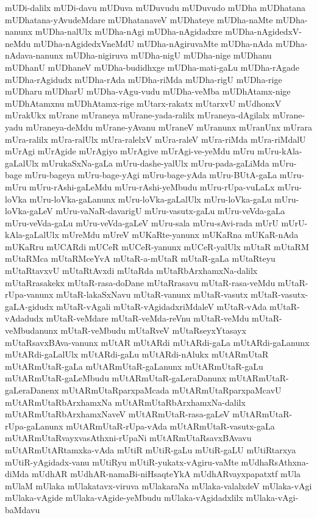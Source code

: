 {mUDi-dalilx
mUDi-davu
mUDuva
mUDuvudu
mUDuvudo
mUDha
mUDhatana
mUDhatana-yAvudeMdare
mUDhatanaveV
mUDhateye
mUDha-naMte
mUDha-nanunx
mUDha-nalUlx
mUDha-nAgi
mUDha-nAgidadxre
mUDha-nAgidedxV-neMdu
mUDha-nAgidedxVneMdU
mUDha-nAgiruvaMte
mUDha-nAda
mUDha-nAdava-nanunx
mUDha-nigiruva
mUDha-nigU
mUDha-nige
mUDhanu
mUDhanU
mUDhaneV
mUDha-budidhxge
mUDha-mati-gaLu
mUDha-rAgade
mUDha-rAgidudx
mUDha-rAda
mUDha-riMda
mUDha-rigU
mUDha-rige
mUDharu
mUDharU
mUDha-vAgu-vudu
mUDha-veMba
mUDhAtamx-nige
mUDhAtamxnu
mUDhAtamx-rige
mUtarx-rakatx
mUtarxvU
mUdhonxV
mUrakUkx
mUrane
mUraneya
mUrane-yada-ralilx
mUraneya-dAgilalx
mUrane-yadu
mUraneya-deMdu
mUrane-yAvanu
mUraneV
mUranunx
mUranUnx
mUrara
mUra-ralilx
mUra-ralUlx
mUra-ralelxV
mUra-raleV
mUra-riMda
mUra-riMdalU
mUrAgi
mUrAgide
mUrAgiyo
mUrAgive
mUrAgi-ve-yeMdu
mUru
mUru-kAla-gaLalUlx
mUrukaSxNa-gaLa
mUru-dashe-yalUlx
mUru-pada-gaLiMda
mUru-bage
mUru-bageya
mUru-bage-yAgi
mUru-bage-yAda
mUru-BUtA-gaLa
mUru-mUru
mUru-rAshi-gaLeMdu
mUru-rAshi-yeMbudu
mUru-rUpa-vuLaLx
mUru-loVka
mUru-loVka-gaLanunx
mUru-loVka-gaLalUlx
mUru-loVka-gaLu
mUru-loVka-gaLeV
mUru-vaNaR-davarigU
mUru-vasutx-gaLu
mUru-veVda-gaLa
mUru-veVda-gaLu
mUru-veVda-gaLeV
mUru-sala
mUru-sAvi-rada
mUrU
mUrU-kAla-gaLalUlx
mUreMdu
mUreV
mUKaRte-yanunx
mUKaRna
mUKaR-nAda
mUKaRru
mUCARdi
mUCeR
mUCeR-yanunx
mUCeR-yalUlx
mUtaR
mUtaRM
mUtaRMca
mUtaRMceYvA
mUtaR-a-mUtaR
mUtaR-gaLa
mUtaRteyu
mUtaRtavxvU
mUtaRtAvxdi
mUtaRda
mUtaRbArxhamxNa-dalilx
mUtaRrasakekx
mUtaR-rasa-doDane
mUtaRrasavu
mUtaR-rasa-veMdu
mUtaR-rUpa-vanunx
mUtaR-lakaSxNavu
mUtaR-vanunx
mUtaR-vasutx
mUtaR-vasutx-gaLA-gidudx
mUtaR-vAgali
mUtaR-vAgidadxriMdaleV
mUtaR-vAda
mUtaR-vAdadudx
mUtaR-veMdare
mUtaR-veMda-reVnu
mUtaR-veMdu
mUtaR-veMbudanunx
mUtaR-veMbudu
mUtaRveV
mUtaRseyxYtasayx
mUtaRsavxBAva-vanunx
mUtAR
mUtARdi
mUtARdi-gaLa
mUtARdi-gaLanunx
mUtARdi-gaLalUlx
mUtARdi-gaLu
mUtARdi-nAlukx
mUtARmUtaR
mUtARmUtaR-gaLa
mUtARmUtaR-gaLanunx
mUtARmUtaR-gaLu
mUtARmUtaR-gaLeMbudu
mUtARmUtaR-gaLeraDanunx
mUtARmUtaR-gaLeraDanenx
mUtARmUtaRparxpaMcada
mUtARmUtaRparxpaMcavU
mUtARmUtaRbArxhamxNa
mUtARmUtaRbArxhamxNa-dalilx
mUtARmUtaRbArxhamxNaveV
mUtARmUtaR-rasa-gaLeV
mUtARmUtaR-rUpa-gaLanunx
mUtARmUtaR-rUpa-vAda
mUtARmUtaR-vasutx-gaLa
mUtARmUtaRvayxvasAthxni-rUpaNi
mUtARmUtaRsavxBAvavu
mUtARmUtARtamxka-vAda
mUtiR
mUtiR-gaLu
mUtiR-gaLU
mUtiRtarxya
mUtiR-yAgidadx-vanu
mUtiRyu
mUtiR-yukatx-vAgiru-vaMte
mUdhaRsAthxna-diMda
mUdhAR
mUdhAR-namaBi-niHsaqteYkA
mUdhARvayxpapatxtf
mUla
mUlaM
mUlaka
mUlakatavx-viruva
mUlakaraNa
mUlaka-valalxdeV
mUlaka-vAgi
mUlaka-vAgide
mUlaka-vAgide-yeMbudu
mUlaka-vAgidadxlilx
mUlaka-vAgi-baMdavu
}
